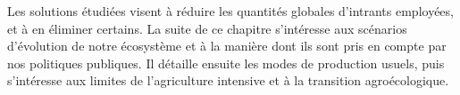 \documentclass[../thesis.tex]{subfiles}
\begin{document}
    
    Les solutions étudiées visent à réduire les quantités globales d'intrants employées, et à en éliminer certains. La suite de ce chapitre s'intéresse aux scénarios d'évolution de notre écosystème et à la manière dont ils sont pris en compte par nos politiques publiques. Il détaille ensuite les modes de production usuels, puis s'intéresse aux limites de l'agriculture intensive et à la transition agroécologique. 
    
    
\end{document}
